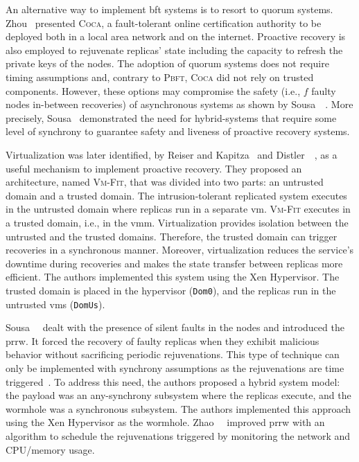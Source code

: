 An alternative way to implement \gls{bft} systems is to resort to quorum systems.
Zhou~\etal{} \cite{Zhou:2002} presented \textsc{Coca}, a fault-tolerant online certification authority to be deployed both in a local area network and on the internet.
Proactive recovery is also employed to rejuvenate replicas' state including the capacity to refresh the private keys of the nodes.
The adoption of quorum systems does not require timing assumptions and, contrary to \textsc{Pbft}, \textsc{Coca} did not rely on trusted components.
However, these options may compromise the safety (i.e., $f$ faulty nodes in-between recoveries) of asynchronous systems as shown by Sousa~\etal{}~\cite{Sousa:2007}. 
More precisely, Sousa~\etal{} demonstrated the need for hybrid-systems that require some level of synchrony to guarantee safety and liveness of proactive recovery systems.


Virtualization was later identified, by Reiser and Kapitza~\cite{Reiser:2007} and Distler~\etal{}~\cite{Distler:2008}, as a useful mechanism to implement proactive recovery.
They proposed an architecture, named \textsc{Vm-Fit}, that was divided into two parts: an untrusted domain and a trusted domain.
The intrusion-tolerant replicated system executes in the untrusted domain where replicas run in a separate \gls{vm}. 
\textsc{Vm-Fit} executes in a trusted domain, i.e., in the \gls{vmm}. 
Virtualization provides isolation between the untrusted and the trusted domains. 
Therefore, the trusted domain can trigger recoveries in a synchronous manner. 
Moreover, virtualization reduces the service's downtime during recoveries and makes the state transfer between replicas more efficient. 
The authors implemented this system using the Xen Hypervisor.
The trusted domain is placed in the hypervisor (\texttt{Dom0}), and the replicas run in the untrusted \glspl{vm} (\texttt{DomUs}).

Sousa~\etal{}~\cite{Sousa:2010} dealt with the presence of silent faults in the nodes and introduced the \gls{prrw}. 
It forced the recovery of faulty replicas when they exhibit malicious behavior without sacrificing periodic rejuvenations. 
This type of technique can only be implemented with synchrony assumptions as the rejuvenations are time triggered~\cite{Sousa:2005}. 
To address this need, the authors proposed a hybrid system model: the payload was an any-synchrony subsystem where the replicas execute, and the wormhole was a synchronous subsystem. 
The authors implemented this approach using the Xen Hypervisor as the wormhole. 
Zhao~\etal{}~\cite{Zhao:2012} improved \gls{prrw} with an algorithm to schedule the rejuvenations triggered by monitoring the network and CPU/memory usage.


